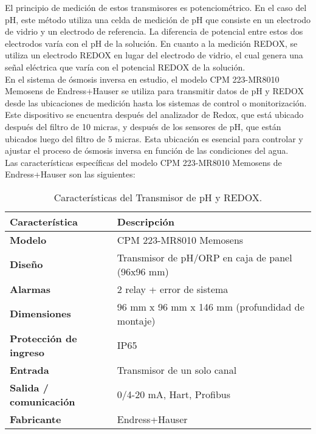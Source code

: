 El principio de medición de estos transmisores es potenciométrico. En el caso del pH, este método utiliza una celda de medición de pH que consiste en un electrodo de vidrio y un electrodo de referencia. La diferencia de potencial entre estos dos electrodos varía con el pH de la solución. En cuanto a la medición REDOX, se utiliza un electrodo REDOX en lugar del electrodo de vidrio, el cual genera una señal eléctrica que varía con el potencial REDOX de la solución.\\

En el sistema de ósmosis inversa en estudio, el modelo CPM 223-MR8010 Memosens de Endress+Hauser se utiliza para transmitir datos de pH y REDOX desde las ubicaciones de medición hasta los sistemas de control o monitorización. Este dispositivo se encuentra después del analizador de Redox, que está ubicado después del filtro de 10 micras, y después de los sensores de pH, que están ubicados luego del filtro de 5 micras. Esta ubicación es esencial para controlar y ajustar el proceso de ósmosis inversa en función de las condiciones del agua.\\

Las características específicas del modelo CPM 223-MR8010 Memosens de Endress+Hauser son las siguientes:\\

\begin{table}[H]
    \centering
    \caption{Características del Transmisor de pH y REDOX.}
    \label{table:dispositivoCPM223}
    \begin{tabular}{| L{5cm} | L{5cm} |}
        \hline
        \textbf{Característica} & \textbf{Descripción}  \\
        \hline
        \textbf{Modelo} & CPM 223-MR8010 Memosens  \\
        \hline
      
        \textbf{Diseño} & Transmisor de pH/ORP en caja de panel (96x96 mm)  \\
        \hline
        \textbf{Alarmas} & 2 relay + error de sistema  \\
        \hline
        \textbf{Dimensiones} & 96 mm x 96 mm x 146 mm (profundidad de montaje)  \\
        \hline
        \textbf{Protección de ingreso} & IP65  \\
        \hline
        \textbf{Entrada} & Transmisor de un solo canal  \\
        \hline
        \textbf{Salida / comunicación} & 0/4-20 mA, Hart, Profibus  \\
        \hline
       
        \textbf{Fabricante} & Endress+Hauser  \\
        \hline
    \end{tabular}
\end{table}
